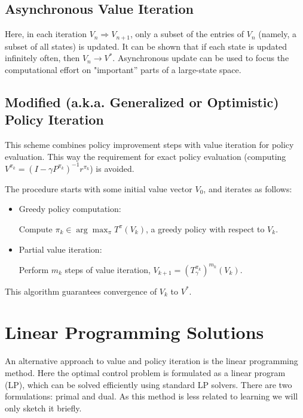 \subsection{Asynchronous Value  Iteration}
Here, in each iteration ${V_n} \Rightarrow {V_{n + 1}}$, only a subset of the entries of  ${V_n}$ (namely, a subset of all states) is updated.
It can be shown that if each state is updated infinitely often, then ${V_n} \to {V^*}$.
Asynchronous update can be used to focus the computational effort on "important'' parts of a large-state space.



\subsection{Modified (a.k.a. Generalized or Optimistic) Policy Iteration}\label{ss:mod_PI}

This scheme combines policy improvement steps with value iteration for policy evaluation. This way the requirement for exact policy evaluation (computing  ${V^{{\pi _k}}} = {(I - \gamma {P^{{\pi _k}}})^{ - 1}}{r^{{\pi _k}}}$) is avoided.

The procedure starts with some initial value vector ${V_0}$, and iterates as follows:
\begin{itemize}
  \item Greedy policy computation:

Compute ${\pi _k} \in \arg {\max _\pi }T_{}^\pi ({V_k})$, a greedy policy with respect to ${V_k}$.
  \item Partial value iteration:

Perform ${m_k}$ steps of value iteration, ${V_{k + 1}} = {(T_\gamma ^{{\pi _k}})^{{m_k}}}({V_k})$.
\end{itemize}

This algorithm guarantees convergence of ${V_k}$ to ${V^*}$.

\section{Linear Programming Solutions}

An alternative approach to value and policy iteration is the linear programming method. Here the optimal control problem is formulated as a linear program (LP), which can be solved efficiently using standard LP solvers. There are two formulations: primal and dual. As this method is less related to learning we will only sketch it briefly.

